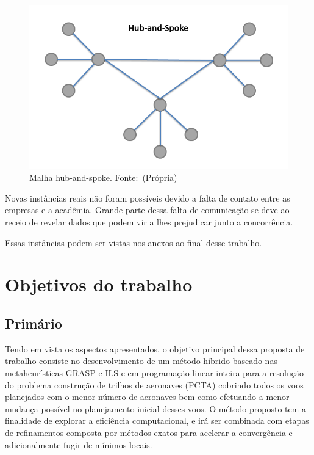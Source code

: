 \begin{figure}[ht]
\caption{Malha hub-and-spoke. \mbox{Fonte: (Própria)}}
\label{fig:hubandspoke}
\includegraphics[scale=0.35]{./img/hubandspoke}
\end{figure}
 	 	
	
Novas instâncias reais não foram possíveis devido a falta de contato entre as
empresas e a acadêmia. Grande parte dessa falta de comunicação se deve ao receio
de revelar dados que podem vir a lhes prejudicar junto a concorrência.

Essas instâncias podem ser vistas nos anexos ao final desse trabalho.


\section {Objetivos do trabalho}


\subsection{Primário}
Tendo em vista os aspectos apresentados, o objetivo principal dessa proposta de
trabalho consiste no desenvolvimento de um método híbrido baseado nas
metaheurísticas GRASP e ILS e em programação linear inteira para a resolução do
problema construção de trilhos de aeronaves (PCTA) cobrindo todos os voos
planejados com o menor número de aeronaves bem como efetuando a menor mudança
possível no planejamento inicial desses voos. O método proposto tem a finalidade
de explorar a eficiência computacional, e irá ser combinada com etapas de
refinamentos composta por métodos exatos para acelerar a convergência e
adicionalmente fugir de mínimos locais.

